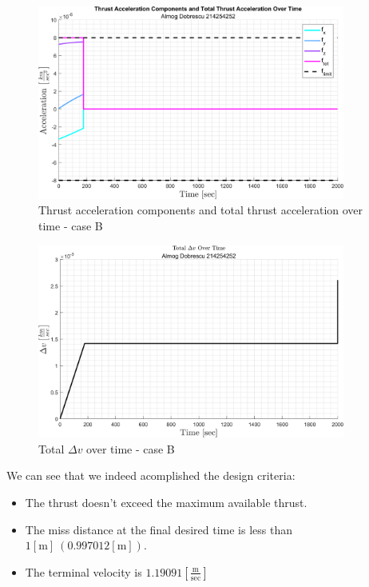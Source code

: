 \documentclass[11pt, a4paper]{article}
\begin{document}
\begin{figure}[H]
    \centering
    \includegraphics[width=0.9\textwidth]{images/graph7.png}
    \caption{Thrust acceleration components and total thrust acceleration over time - case B}
    \label{fig:accel_over_time-caseB}
\end{figure}
\begin{figure}[H]
    \centering
    \includegraphics[width=0.9\textwidth]{images/graph8.png}
    \caption{Total $\Delta v$ over time - case B}
    \label{fig:delta_v_over_time-caseB}
\end{figure}
We can see that we indeed acomplished the design criteria:
\begin{itemize}
    \item The thrust doesn't exceed the maximum available thrust.
    \item The miss distance at the final desired time is less than $1[\mathrm{m}]\ \left(0.997012\left[\mathrm{m}\right]\right)$.
    \item The terminal velocity is $1.19091\left[\displaystyle\frac{\mathrm{m}}{\mathrm{sec}}\right]$
\end{itemize}
\end{document}
